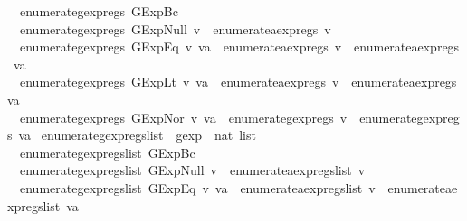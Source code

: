 \begin{isabellebody}
\ \ {\isachardoublequoteopen}enumerate{\isacharunderscore}gexp{\isacharunderscore}regs\ {\isacharparenleft}GExp{\isachardot}Bc\ {\isacharunderscore}{\isacharparenright}\ {\isacharequal}\ {\isacharbraceleft}{\isacharbraceright}{\isachardoublequoteclose}\ {\isacharbar}\isanewline
\ \ {\isachardoublequoteopen}enumerate{\isacharunderscore}gexp{\isacharunderscore}regs\ {\isacharparenleft}GExp{\isachardot}Null\ v{\isacharparenright}\ {\isacharequal}\ enumerate{\isacharunderscore}aexp{\isacharunderscore}regs\ v{\isachardoublequoteclose}\ {\isacharbar}\isanewline
\ \ {\isachardoublequoteopen}enumerate{\isacharunderscore}gexp{\isacharunderscore}regs\ {\isacharparenleft}GExp{\isachardot}Eq\ v\ va{\isacharparenright}\ {\isacharequal}\ enumerate{\isacharunderscore}aexp{\isacharunderscore}regs\ v\ {\isasymunion}\ enumerate{\isacharunderscore}aexp{\isacharunderscore}regs\ va{\isachardoublequoteclose}\ {\isacharbar}\isanewline
\ \ {\isachardoublequoteopen}enumerate{\isacharunderscore}gexp{\isacharunderscore}regs\ {\isacharparenleft}GExp{\isachardot}Lt\ v\ va{\isacharparenright}\ {\isacharequal}\ enumerate{\isacharunderscore}aexp{\isacharunderscore}regs\ v\ {\isasymunion}\ enumerate{\isacharunderscore}aexp{\isacharunderscore}regs\ va{\isachardoublequoteclose}\ {\isacharbar}\isanewline
\ \ {\isachardoublequoteopen}enumerate{\isacharunderscore}gexp{\isacharunderscore}regs\ {\isacharparenleft}GExp{\isachardot}Nor\ v\ va{\isacharparenright}\ {\isacharequal}\ enumerate{\isacharunderscore}gexp{\isacharunderscore}regs\ v\ {\isasymunion}\ enumerate{\isacharunderscore}gexp{\isacharunderscore}regs\ va{\isachardoublequoteclose}\isanewline
\isanewline
{}\isamarkupfalse%
\ enumerate{\isacharunderscore}gexp{\isacharunderscore}regs{\isacharunderscore}list\ {\isacharcolon}{\isacharcolon}\ {\isachardoublequoteopen}gexp\ {\isasymRightarrow}\ nat\ list{\isachardoublequoteclose}\ \isanewline
\ \ {\isachardoublequoteopen}enumerate{\isacharunderscore}gexp{\isacharunderscore}regs{\isacharunderscore}list\ {\isacharparenleft}GExp{\isachardot}Bc\ {\isacharunderscore}{\isacharparenright}\ {\isacharequal}\ {\isacharbrackleft}{\isacharbrackright}{\isachardoublequoteclose}\ {\isacharbar}\isanewline
\ \ {\isachardoublequoteopen}enumerate{\isacharunderscore}gexp{\isacharunderscore}regs{\isacharunderscore}list\ {\isacharparenleft}GExp{\isachardot}Null\ v{\isacharparenright}\ {\isacharequal}\ enumerate{\isacharunderscore}aexp{\isacharunderscore}regs{\isacharunderscore}list\ v{\isachardoublequoteclose}\ {\isacharbar}\isanewline
\ \ {\isachardoublequoteopen}enumerate{\isacharunderscore}gexp{\isacharunderscore}regs{\isacharunderscore}list\ {\isacharparenleft}GExp{\isachardot}Eq\ v\ va{\isacharparenright}\ {\isacharequal}\ enumerate{\isacharunderscore}aexp{\isacharunderscore}regs{\isacharunderscore}list\ v\ {\isacharat}\ enumerate{\isacharunderscore}aexp{\isacharunderscore}regs{\isacharunderscore}list\ va{\isachardoublequoteclose}\ {\isacharbar}\isanewline

\end{isabellebody}
